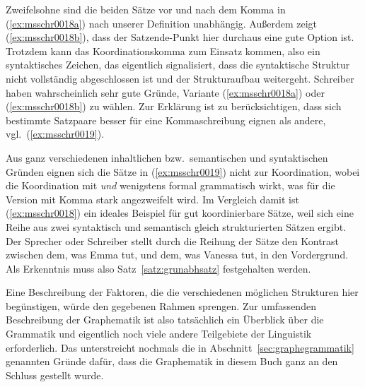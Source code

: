 Zweifelsohne sind die beiden Sätze vor und nach dem Komma in (\ref{ex:msschr0018a}) nach unserer Definition unabhängig.
Außerdem zeigt (\ref{ex:msschr0018b}), dass der Satzende-Punkt hier durchaus eine gute Option ist.
Trotzdem kann das Koordinationskomma zum Einsatz kommen, also ein syntaktisches Zeichen, das eigentlich signalisiert, dass die syntaktische Struktur nicht vollständig abgeschlossen ist und der Strukturaufbau weitergeht.
Schreiber haben wahrscheinlich sehr gute Gründe, Variante (\ref{ex:msschr0018a}) oder (\ref{ex:msschr0018b}) zu wählen.
Zur Erklärung ist zu berücksichtigen, dass sich bestimmte Satzpaare besser für eine Kommaschreibung eignen als andere, vgl.\ (\ref{ex:msschr0019}).

\begin{exe}
  \ex\label{ex:msschr0019} 
  \begin{xlist}
  \end{xlist}
\end{exe}

Aus ganz verschiedenen inhaltlichen bzw.\ semantischen und syntaktischen Gründen eignen sich die Sätze in (\ref{ex:msschr0019}) nicht zur Koordination, wobei die Koordination mit \textit{und} wenigstens formal grammatisch wirkt, was für die Version mit Komma stark angezweifelt wird.
Im Vergleich damit ist (\ref{ex:msschr0018}) ein ideales Beispiel für gut koordinierbare Sätze, weil sich eine Reihe aus zwei syntaktisch und semantisch gleich strukturierten Sätzen ergibt.
Der Sprecher oder Schreiber stellt durch die Reihung der Sätze den Kontrast zwischen dem, was Emma tut, und dem, was Vanessa tut, in den Vordergrund.
Als Erkenntnis muss also Satz~\ref{satz:grunabhsatz} festgehalten werden.


Eine Beschreibung der Faktoren, die die verschiedenen möglichen Strukturen hier begünstigen, würde den gegebenen Rahmen sprengen.
Zur umfassenden Beschreibung der Graphematik ist also tatsächlich ein Überblick über die Grammatik und eigentlich noch viele andere Teilgebiete der Linguistik erforderlich.
Das unterstreicht nochmals die in Abschnitt~\ref{sec:graphegrammatik} genannten Gründe dafür, dass die Graphematik in diesem Buch ganz an den Schluss gestellt wurde.

